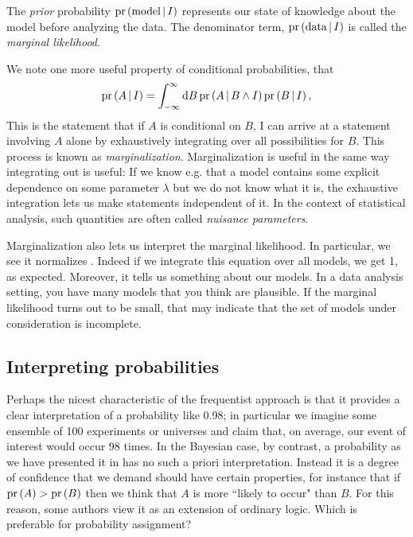 The {\it prior}
probability $\pr{\text{model}\given I}$ represents our state of
knowledge about the model before analyzing the data. The denominator term,
$\pr{\text{data}\given I}$ is called the {\it marginal likelihood}. 

We note one more useful property of conditional probabilities, that
\begin{equation}
\pr{A\given I}=\int_{-\infty}^\infty \dd{B} \pr{A\given B\land I}\pr{B\given I},
\end{equation}
This is the statement that if $A$ is conditional on $B$, I can arrive at a
statement involving $A$ alone by exhaustively integrating over all
possibilities for $B$. This process is known as {\it marginalization}.
Marginalization is useful in the same way integrating out is useful: If we know
e.g. that a model contains some explicit dependence on some parameter $\lambda$
but we do not know what it is, the exhaustive integration lets us make statements
independent of it. In the context of statistical analysis, such quantities are
often called {\it nuisance parameters}.

Marginalization also lets us interpret the marginal likelihood. In particular,
we see it normalizes . Indeed if we 
integrate this equation over all models, we get 1, as expected. 
Moreover, it tells us something about our models. In a data analysis setting,
you have many models that you think are plausible. If the marginal likelihood
turns out to be small, that may indicate that the set of models under
consideration is incomplete.

\subsection{Interpreting probabilities}

Perhaps the nicest characteristic of the frequentist approach is that it
provides a clear interpretation of a probability like 0.98; in particular we
imagine some ensemble of 100 experiments or universes and claim that, on
average, our event of interest would occur 98 times. In the Bayesian case, by
contrast, a probability as we have presented it in
 has no such a priori interpretation. Instead it
is a degree of confidence that we demand should have certain properties, for
instance that if $\pr{A}>\pr{B}$ then we think that $A$ is more ``likely to
occur" than $B$. For this reason, some authors view it as an extension of
ordinary logic. Which is preferable for probability assignment?

